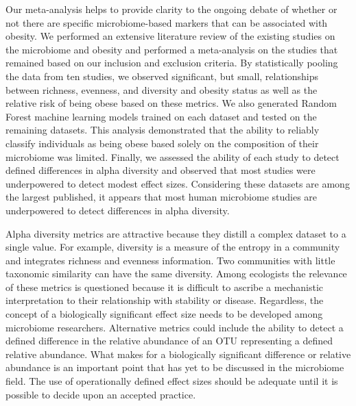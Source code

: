 \documentclass[12pt,]{article}
\begin{document}
Our meta-analysis helps to provide clarity to the ongoing debate of
whether or not there are specific microbiome-based markers that can be
associated with obesity. We performed an extensive literature review of
the existing studies on the microbiome and obesity and performed a
meta-analysis on the studies that remained based on our inclusion and
exclusion criteria. By statistically pooling the data from ten studies,
we observed significant, but small, relationships between richness,
evenness, and diversity and obesity status as well as the relative risk
of being obese based on these metrics. We also generated Random Forest
machine learning models trained on each dataset and tested on the
remaining datasets. This analysis demonstrated that the ability to
reliably classify individuals as being obese based solely on the
composition of their microbiome was limited. Finally, we assessed the
ability of each study to detect defined differences in alpha diversity
and observed that most studies were underpowered to detect modest effect
sizes. Considering these datasets are among the largest published, it
appears that most human microbiome studies are underpowered to detect
differences in alpha diversity.

Alpha diversity metrics are attractive because they distill a complex
dataset to a single value. For example, diversity is a measure of the
entropy in a community and integrates richness and evenness information.
Two communities with little taxonomic similarity can have the same
diversity. Among ecologists the relevance of these metrics is questioned
because it is difficult to ascribe a mechanistic interpretation to their
relationship with stability or disease. Regardless, the concept of a
biologically significant effect size needs to be developed among
microbiome researchers. Alternative metrics could include the ability to
detect a defined difference in the relative abundance of an OTU
representing a defined relative abundance. What makes for a biologically
significant difference or relative abundance is an important point that
has yet to be discussed in the microbiome field. The use of
operationally defined effect sizes should be adequate until it is
possible to decide upon an accepted practice.
\end{document}
